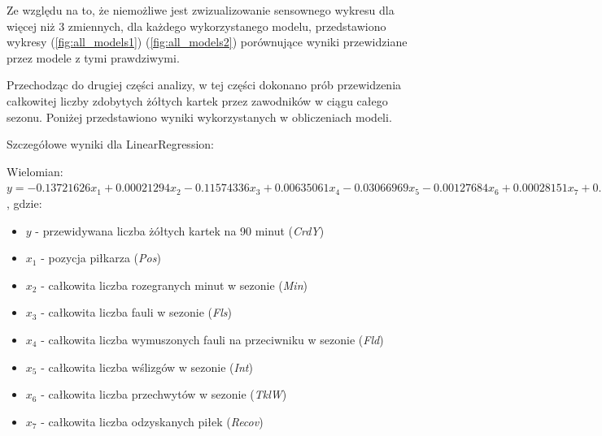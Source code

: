 \documentclass{article}
\begin{document}
Ze względu na to, że niemożliwe jest zwizualizowanie sensownego wykresu dla więcej niż 3 zmiennych, dla każdego wykorzystanego modelu, przedstawiono wykresy (\ref{fig:all_models1}) (\ref{fig:all_models2}) porównujące wyniki przewidziane przez modele z tymi prawdziwymi. 

\newpage
Przechodząc do drugiej części analizy, w tej części dokonano prób przewidzenia całkowitej liczby zdobytych żółtych kartek przez zawodników w ciągu całego sezonu. Poniżej przedstawiono wyniki wykorzystanych w obliczeniach modeli.
\vspace{0.5cm}

Szczegółowe wyniki dla LinearRegression:
\vspace{0.5cm}

Wielomian:
$y = -0.13721626x_1 + 0.00021294x_2 - 0.11574336x_3  + 0.00635061x_4 - 0.03066969x_5 - 0.00127684x_6 + 0.00028151x_7 + 0.6805319$, gdzie:

\begin{itemize}[label={}, leftmargin=*]
  \item $y$ - przewidywana liczba żółtych kartek na 90 minut (\textit{CrdY})
  \item $x_1$ - pozycja piłkarza (\textit{Pos})
  \item $x_2$ - całkowita liczba rozegranych minut w sezonie  (\textit{Min})
  \item $x_3$ - całkowita liczba fauli w sezonie  (\textit{Fls})
  \item $x_4$ - całkowita liczba wymuszonych fauli na przeciwniku w sezonie  (\textit{Fld})
  \item $x_5$ - całkowita liczba wślizgów w sezonie  (\textit{Int})
  \item $x_6$ - całkowita liczba przechwytów w sezonie  (\textit{TklW})
  \item $x_7$ - całkowita liczba odzyskanych piłek  (\textit{Recov})
\end{itemize}
\end{document}
